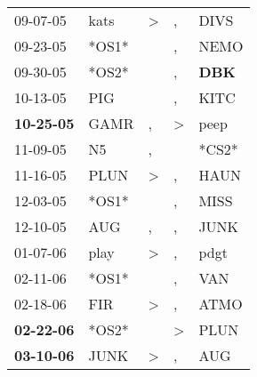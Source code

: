 \begin{supertabular}{p{0.07\textwidth}p{0.06\textwidth}p{0.02\textwidth}p{0.02\textwidth}p{0.06\textwidth}}
          09-07-05\textsuperscript{} &           kats\textsuperscript{} &     \textgreater &                , &           DIVS\textsuperscript{} \\
          09-23-05\textsuperscript{} &                            *OS1* &                  &                , &           NEMO\textsuperscript{} \\
          09-30-05\textsuperscript{} &                            *OS2* &                  &                , &   \textbf{DBK\textsuperscript{}} \\
          10-13-05\textsuperscript{} &            PIG\textsuperscript{} &                  &                , &           KITC\textsuperscript{} \\
 \textbf{10-25-05\textsuperscript{}} &           GAMR\textsuperscript{} &                , &     \textgreater &           peep\textsuperscript{} \\
          11-09-05\textsuperscript{} &             N5\textsuperscript{} &                , &                  &                            *CS2* \\
          11-16-05\textsuperscript{} &           PLUN\textsuperscript{} &     \textgreater &                , &           HAUN\textsuperscript{} \\
          12-03-05\textsuperscript{} &                            *OS1* &                  &                , &           MISS\textsuperscript{} \\
          12-10-05\textsuperscript{} &            AUG\textsuperscript{} &                , &                , &           JUNK\textsuperscript{} \\
          01-07-06\textsuperscript{} &           play\textsuperscript{} &     \textgreater &                , &           pdgt\textsuperscript{} \\
          02-11-06\textsuperscript{} &                            *OS1* &                  &                , &            VAN\textsuperscript{} \\
          02-18-06\textsuperscript{} &            FIR\textsuperscript{} &     \textgreater &                , &           ATMO\textsuperscript{} \\
 \textbf{02-22-06\textsuperscript{}} &                            *OS2* &                  &     \textgreater &           PLUN\textsuperscript{} \\
 \textbf{03-10-06\textsuperscript{}} &           JUNK\textsuperscript{} &     \textgreater &                , &            AUG\textsuperscript{} \\

\end{supertabular}

